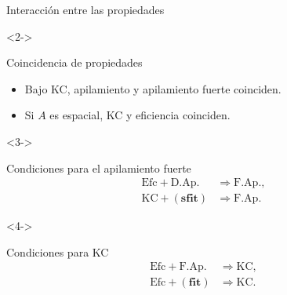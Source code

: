 \documentclass[compress,12pt]{beamer}
\begin{document}
\begin{frame}{Interacción entre las propiedades}

\begin{uncoverenv}<2->
\begin{block}{Coincidencia de propiedades}
\begin{itemize}
    \item Bajo KC, apilamiento y apilamiento fuerte
    coinciden.
    \item Si $A$ es espacial, KC y eficiencia
    coinciden.
\end{itemize}
\end{block}
\end{uncoverenv}
\begin{uncoverenv}<3->
\begin{block}{Condiciones para el apilamiento fuerte}
\[
\begin{aligned}
\mathrm{Efc}+\mathrm{D.Ap.}
    &\Rightarrow \mathrm{F.Ap.},\\
\mathrm{KC}+\mathbf{(sfit)}
    &\Rightarrow \mathrm{F.Ap.}
\end{aligned}
\]
\end{block}
\end{uncoverenv}
\begin{uncoverenv}<4->
\begin{block}{Condiciones para KC}
\[
\begin{aligned}
\mathrm{Efc}+\mathrm{F.Ap.}
    &\Rightarrow \mathrm{KC},\\
\mathrm{Efc}+\mathbf{(fit)}
    &\Rightarrow \mathrm{KC}.
\end{aligned}
\]
\end{block}
\end{uncoverenv}

\end{frame}
\end{document}
